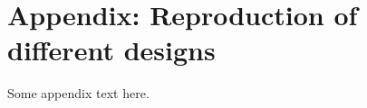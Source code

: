 \newpage

\appendix
\section{Appendix: Reproduction of different designs}
Some appendix text here.









